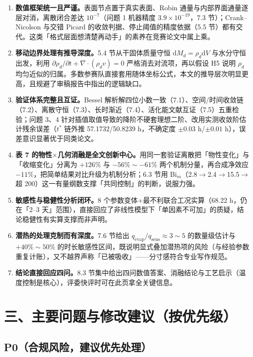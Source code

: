 \documentclass[12pt,a4paper]{ctexart}
\begin{document}
\begin{enumerate}[label=(\arabic*),leftmargin=2em]
\item \textbf{数值框架统一且严谨。}表面节点置于真实表面、Robin 通量与内部界面通量逐层对消，离散闭合差达 $10^{-7}$（问题 1 机器精度 $3.9\times10^{-19}$，7.3 节）；Crank--Nicolson 与交错 Picard 的收敛判据、停止阈值的精度依据（5.5 节）都有交代。这类「格式层面想清楚再动手」的素养在竞赛论文中属上乘。
\item \textbf{移动边界处理有推导深度。}5.4 节从干固体质量守恒 $\mathrm{d}M_d=\rho_d\mathrm{d}V$ 与水分守恒出发，利用 $\partial\rho_d/\partial t+\nabla\cdot(\rho_d v)=0$ 严格消去对流项，再以假设 H5 说明 $\rho_d$ 均匀近似的归属。多数参赛队直接套用随体坐标公式，本文的推导层次明显更高，且规避了审稿报告中指出的逻辑缺口。
\item \textbf{验证体系完整且互证。}Bessel 解析解四位小数一致（7.1）、空间/时间收敛链（7.2）、离散守恒（7.3）、长时渐近（7.4）、活化能文献互证（7.5）五重检验；问题 3、4 针对插值取值导致的降阶不硬套理想二阶、改用实测收敛阶估计残余误差（$t^*$ 链外推 57.1732/50.8239 h，不确定度 $\pm0.03$ h/$\pm0.01$ h），误差意识显著优于同类论文。
\item \textbf{表 7 的物性$\times$几何消融是全文创新中心。}用同一套验证离散把「物性变化」与「收缩变化」分离为 $+126\%$ 与 $-56\%\sim-61\%$ 两个机制分量，再合成净效应 $-11\%$，把简单结果对比升级为机制分析；6.3 节用 Bi$_m$（2.8$\to$2.4$\to$15.5$\to$超 200）这一有量纲数支撑「共同控制」的判断，说服力强。
\item \textbf{敏感性与稳健性分析闭环。}8 个参数变体+最不利联合工况实算（68.22 h，仍在「2--3 天」范围），直接回应了非线性模型下「单因素不可加」的质疑，结论稳健性有实算支撑而非声明。
\item \textbf{潜热的处理克制而有深度。}7.6 节给出 $q_{\mathrm{evap}}/q_{\mathrm{sens}}\approx3\sim5$ 的数量级估计与 $+40\%\sim50\%$ 的时长敏感性区间，既说明显式叠加潜热项的风险（与经验参数重复计账），又不越界声称「已被吸收」——分寸感符合专业写作规范。
\item \textbf{结论直接回应四问。}8.3 节集中给出四问数值答案、消融结论与工艺启示（温度控制是核心），评委快评时可在此页拿全关键信息。
\end{enumerate}

\section{三、主要问题与修改建议（按优先级）}

\subsection{P0（合规风险，建议优先处理）}
\end{document}
